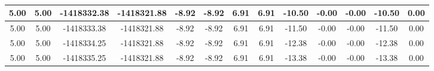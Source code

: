 \begin{table}[htbp]
\begin{adjustbox}{angle=90}
\begin{tabular}{|c|c|c|c|c|c|c|c|c|c|c|c|c|}
 5.00 & 5.00 & -1418332.38 & -1418321.88 & -8.92 & -8.92 & 6.91 & 6.91 & -10.50 & -0.00 & -0.00 & -10.50 & 0.00\\ \hline
 5.00 & 5.00 & -1418333.38 & -1418321.88 & -8.92 & -8.92 & 6.91 & 6.91 & -11.50 & -0.00 & -0.00 & -11.50 & 0.00\\ \hline
 5.00 & 5.00 & -1418334.25 & -1418321.88 & -8.92 & -8.92 & 6.91 & 6.91 & -12.38 & -0.00 & -0.00 & -12.38 & 0.00\\ \hline
 5.00 & 5.00 & -1418335.25 & -1418321.88 & -8.92 & -8.92 & 6.91 & 6.91 & -13.38 & -0.00 & -0.00 & -13.38 & 0.00\\ \hline
            \end{tabular}
        \end{adjustbox}
        \caption{}
        \label{}
    \end{table}
    